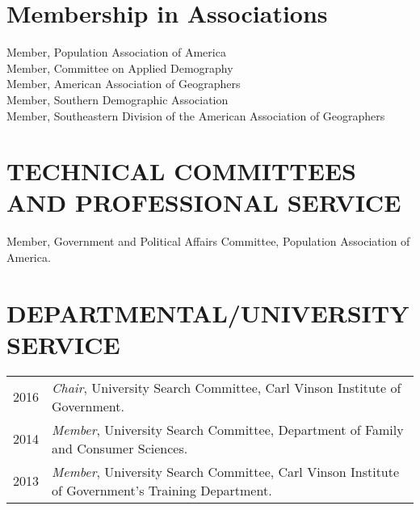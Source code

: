 \documentclass[letterpaper,11pt]{article}
\begin{document}

%



\section{Membership in Associations}
Member, Population Association of America\\
Member, Committee on Applied Demography\\
Member, American Association of Geographers\\
Member, Southern Demographic Association\\
Member, Southeastern Division of the American Association of Geographers

\section{TECHNICAL COMMITTEES AND PROFESSIONAL SERVICE}
Member, Government and Political Affairs Committee, Population Association of America.
% 


\section{DEPARTMENTAL/UNIVERSITY SERVICE}
\begin{tabularx}{\linewidth}{lX}
2016 & \textit{Chair}, University Search Committee, Carl Vinson Institute of Government.\\
2014 & \textit{Member}, University Search Committee, Department of Family and Consumer Sciences.\\
2013 & \textit{Member}, University Search Committee, Carl Vinson Institute of Government's Training Department.\\
\end{tabularx}
\end{document}
